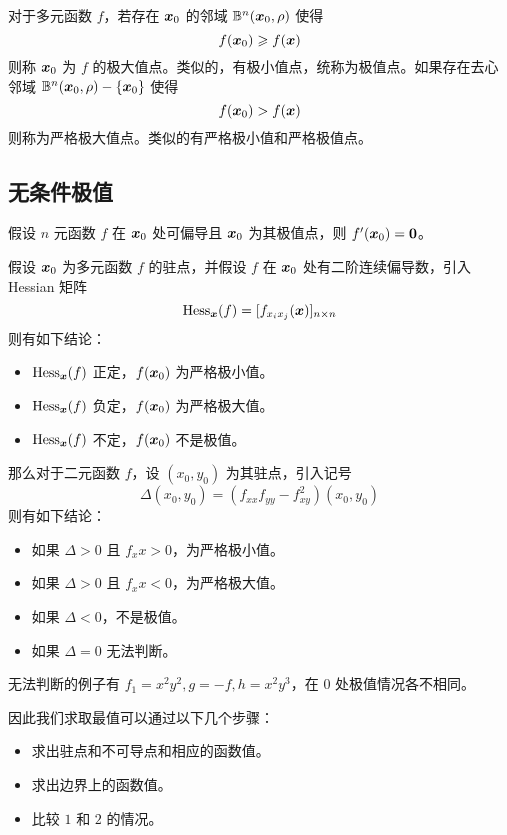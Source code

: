 对于多元函数 $f$，若存在 $\boldsymbol{x}_0$ 的邻域 $\mathbb{B}^n(\boldsymbol{x}_0, \rho)$ 使得
\[ f(\boldsymbol{x}_0) \geqslant f(\boldsymbol{x}) \]
则称 $\boldsymbol{x}_0$ 为 $f$ 的极大值点。类似的，有极小值点，统称为极值点。如果存在去心邻域 $\mathbb{B}^n(\boldsymbol{x}_0, \rho) - \{\boldsymbol{x}_0\}$ 使得
\[ f(\boldsymbol{x}_0) > f(\boldsymbol{x}) \]
则称为严格极大值点。类似的有严格极小值和严格极值点。

\subsection{无条件极值}

\begin{theorem}
	假设 $n$ 元函数 $f$ 在 $\boldsymbol{x}_0$ 处可偏导且 $\boldsymbol{x}_0$ 为其极值点，则 $f'(\boldsymbol{x}_0) = \boldsymbol{0}$。
\end{theorem}

\begin{theorem}
	假设 $\boldsymbol{x}_0$ 为多元函数 $f$ 的驻点，并假设 $f$ 在 $\boldsymbol{x}_0$ 处有二阶连续偏导数，引入 Hessian 矩阵
	\[ \operatorname{Hess}_{\boldsymbol{x}}(f) = [f_{x_i x_j}(\boldsymbol{x})]_{n \times n} \]
	则有如下结论：
	\begin{itemize}
		\item $\operatorname{Hess}_{\boldsymbol{x}}(f)$ 正定，$f(\boldsymbol{x}_0)$ 为严格极小值。
		\item $\operatorname{Hess}_{\boldsymbol{x}}(f)$ 负定，$f(\boldsymbol{x}_0)$ 为严格极大值。
		\item $\operatorname{Hess}_{\boldsymbol{x}}(f)$ 不定，$f(\boldsymbol{x}_0)$ 不是极值。
	\end{itemize}
\end{theorem}

那么对于二元函数 $f$，设 $(x_0, y_0)$ 为其驻点，引入记号
\[ \Delta(x_0, y_0) = (f_{xx} f_{yy} - f_{xy}^2)(x_0, y_0) \]
则有如下结论：
\begin{itemize}
	\item 如果 $\Delta > 0$ 且 $f_xx > 0$，为严格极小值。
	\item 如果 $\Delta > 0$ 且 $f_xx < 0$，为严格极大值。
	\item 如果 $\Delta < 0$，不是极值。
	\item 如果 $\Delta = 0$ 无法判断。
\end{itemize}

无法判断的例子有 $f_1 = x^2y^2, g = -f, h = x^2 y^3$，在 $0$ 处极值情况各不相同。

因此我们求取最值可以通过以下几个步骤：

\begin{itemize}
	\item 求出驻点和不可导点和相应的函数值。
	\item 求出边界上的函数值。
	\item 比较 $1$ 和 $2$ 的情况。
\end{itemize}

